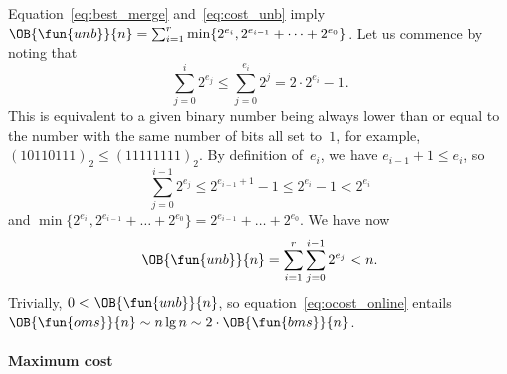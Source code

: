 \bigskip

\noindent Equation~\eqref{eq:best_merge} and~\eqref{eq:cost_unb} imply
\(\OB{\fun{unb}}{n} = \sum_{i=1}^{r}{\min\{2^{e_i},2^{e_{i-1}} + \dots
  + 2^{e_0}\}}\). Let us commence by
noting that
\begin{equation*}
  \sum_{j=0}^{i}{2^{e_j}} \leqslant \sum_{j=0}^{e_i}{2^j} = 2 \cdot
  2^{e_i} - 1.
\end{equation*}
This is equivalent to a given binary number being always lower than or
equal to the number with the same number of bits all set to~\(1\), for
example, \((10110111)_2 \leqslant (11111111)_2\). By definition
of~\(e_i\), we have \(e_{i-1} + 1 \leqslant e_i\), so
\begin{equation*}
  \sum_{j=0}^{i-1}{2^{e_j}} \leqslant 2^{e_{i-1}+1} - 1 \leqslant 2^{e_i} - 1 < 2^{e_i}
\end{equation*}
and \(\min\{2^{e_i},2^{e_{i-1}} + \dots + 2^{e_0}\} = 2^{e_{i-1}} +
\dots + 2^{e_0}\). We have now
\begin{equation}
\OB{\fun{unb}}{n} = \sum_{i=1}^{r}\sum_{j=0}^{i-1}{2^{e_j}} < n.
\label{ineq:OBunb}
\end{equation}
Trivially, \(0 < \OB{\fun{unb}}{n}\), so
equation~\eqref{eq:ocost_online} entails \(\OB{\fun{oms}}{n}
\sim n\lg n \sim 2 \cdot \OB{\fun{bms}}{n}\).

\paragraph{Maximum cost}

